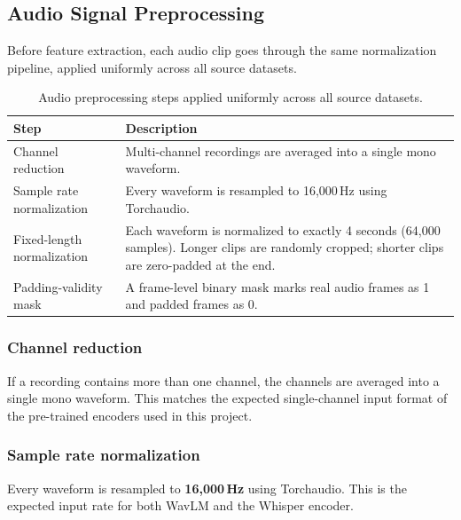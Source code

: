 \documentclass[11pt,a4paper]{article}
\begin{document}
\subsection{Audio Signal Preprocessing}

Before feature extraction, each audio clip goes through the same normalization
pipeline, applied uniformly across all source datasets.

\begin{table}[htbp]
  \centering
  \caption{Audio preprocessing steps applied uniformly across all source datasets.}
  \label{tab:preproc}
  \begin{tabular}{L{4cm}L{9cm}}
    \toprule
    Step & Description \\
    \midrule
    Channel reduction          & Multi-channel recordings are averaged into a
                                 single mono waveform. \\[4pt]
    Sample rate normalization  & Every waveform is resampled to 16,000\,Hz using
                                 Torchaudio. \\[4pt]
    Fixed-length normalization & Each waveform is normalized to exactly 4 seconds
                                 (64,000 samples). Longer clips are randomly
                                 cropped; shorter clips are zero-padded at the
                                 end. \\[4pt]
    Padding-validity mask      & A frame-level binary mask marks real audio frames
                                 as 1 and padded frames as 0. \\
    \bottomrule
  \end{tabular}
\end{table}

\subsubsection{Channel reduction}

If a recording contains more than one channel, the channels are averaged into a
single mono waveform. This matches the expected single-channel input format of the
pre-trained encoders used in this project.

\subsubsection{Sample rate normalization}

Every waveform is resampled to \textbf{16,000\,Hz} using Torchaudio. This is the
expected input rate for both WavLM and the Whisper encoder.
\end{document}
